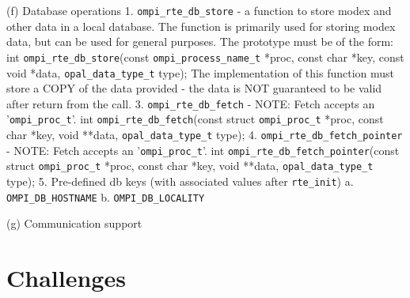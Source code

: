  (f) Database operations
     1. \verb|ompi_rte_db_store| - a function to store modex and other data in
        a local database. The function is primarily used for storing modex
        data, but can be used for general purposes. The prototype must be
        of the form:
        int \verb|ompi_rte_db_store|(const \verb|ompi_process_name_t| *proc,
                              const char *key, const void *data,
                              \verb|opal_data_type_t| type);
        The implementation of this function must store a COPY of the data
        provided - the data is NOT guaranteed to be valid after return
        from the call.
     3. \verb|ompi_rte_db_fetch| -
        NOTE: Fetch accepts an '\verb|ompi_proc_t|'.
        int \verb|ompi_rte_db_fetch|(const struct \verb|ompi_proc_t| *proc,
                              const char *key,
                              void **data,
                              \verb|opal_data_type_t| type);
     4. \verb|ompi_rte_db_fetch_pointer| -
        NOTE: Fetch accepts an '\verb|ompi_proc_t|'.
        int \verb|ompi_rte_db_fetch_pointer|(const struct \verb|ompi_proc_t| *proc,
                                      const char *key,
                                      void **data,
                                      \verb|opal_data_type_t| type);
     5. Pre-defined db keys (with associated values after \verb|rte_init|)
        a. \verb|OMPI_DB_HOSTNAME|
        b. \verb|OMPI_DB_LOCALITY|

  (g) Communication support

\section{Challenges}
\label{sec:challenges}




